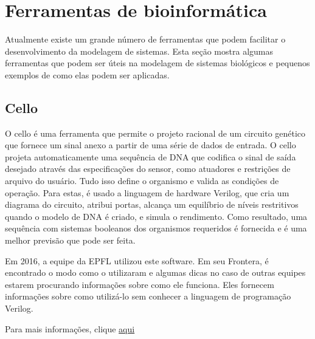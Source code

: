 \documentclass[11pt, letterpaper, portuguese]{article}
\begin{document}
\newpage

\section{Ferramentas de bioinformática}
\par{Atualmente existe um grande número de ferramentas que podem facilitar o desenvolvimento da modelagem de sistemas. Esta seção mostra algumas ferramentas que podem ser úteis na modelagem de sistemas biológicos e pequenos exemplos de como elas podem ser aplicadas.}

    \subsection{Cello}
    \par{O cello é uma ferramenta que permite o projeto racional de um circuito genético que fornece um sinal anexo a partir de uma série de dados de entrada. O cello projeta automaticamente uma sequência de DNA que codifica o sinal de saída desejado através das especificações do sensor, como atuadores e restrições de arquivo do usuário. Tudo isso define o organismo e valida as condições de operação. Para estas, é usado a linguagem de hardware Verilog, que cria um diagrama do circuito, atribui portas, alcança um equilíbrio de níveis restritivos quando o modelo de DNA é criado, e simula o rendimento. Como resultado, uma sequência com sistemas booleanos dos organismos requeridos é fornecida e é uma melhor previsão que pode ser feita.}
    \par{Em 2016, a equipe da EPFL utilizou este software. Em seu Frontera, é encontrado o modo como o utilizaram e algumas dicas no caso de outras equipes estarem procurando informações sobre como ele funciona. Eles fornecem informações sobre como utilizá-lo sem conhecer a linguagem de programação Verilog.}
    \par{Para mais informações, clique  \href{https://2016.igem.org/Team:EPFL/Software_CELLO}{aqui}}
    
\end{document}
